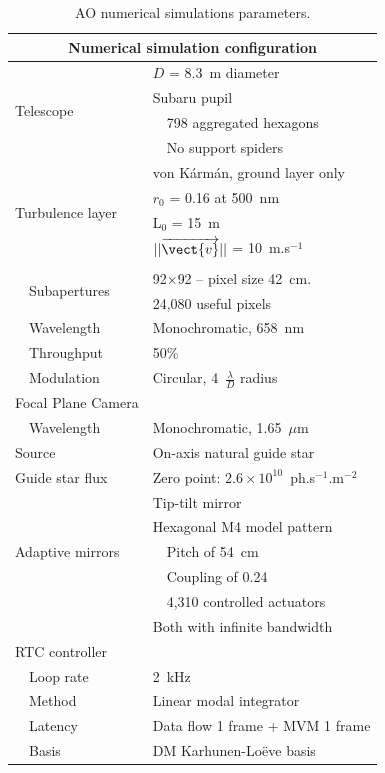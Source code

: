 \documentclass[twocolumn]{aastex62}
\begin{document}
\begin{table}[ht!]
		\centering
		\caption{%
			AO numerical simulations parameters.
		}
		\label{tab:simuParams}
		
		\renewcommand{\arraystretch}{1.2}
		\begin{tabular}{ll}
			\multicolumn{2}{c}{\textbf{Numerical simulation configuration}}\\
			\hline\hline
			\multirow{4}{*}{Telescope} & $D$ = 8.3~m diameter\\
			& Subaru pupil \\
			& $\quad$798 aggregated hexagons\\
			& $\quad$No support spiders\\
			\hline
			\multirow{5}{*}{Turbulence layer} & von Kármán, ground layer only\\
			& $r_0$ = 0.16 at 500~nm \\ %
			& L$_0$ = 15~m\\
			& $||\overrightarrow{\vect{v}}||$ = 10~m.s$^{-1}$\\
			\hline
			PWFS & \\
			\multirow{2}{*}{$\quad$Subapertures} & 92$\times$92 -- pixel size 42~cm.\\
			& 24,080 useful pixels\\
			$\quad$Wavelength & Monochromatic, 658~nm\\
			$\quad$Throughput & 50\% \\
			$\quad$Modulation & Circular, 4~$\frac{\lambda}{D}$ radius\\
			\hline
			Focal Plane Camera & \\
			$\quad$Wavelength & Monochromatic, 1.65~$\mu$m\\ 
			\hline 
			Source & On-axis natural guide star\\
			Guide star flux & Zero point: $2.6 \times 10^{10}$~ph.s$^{-1}$.m$^{-2}$\\
			\hline
			\multirow{5}{*}{Adaptive mirrors} & Tip-tilt mirror\\
			& Hexagonal M4 model pattern\\
			& $\quad$Pitch of 54~cm\\
			& $\quad$Coupling of 0.24\\
			& $\quad$4,310 controlled actuators\\
			& Both with infinite bandwidth\\
			\hline
			RTC controller & \\
			$\quad$Loop rate & 2~kHz\\
			$\quad$Method & Linear modal integrator\\
			$\quad$Latency & Data flow 1 frame + MVM 1 frame\\
			$\quad$Basis & DM Karhunen-Loëve basis\tablefootmark{(a)}\\
			\hline
		\end{tabular}
	\end{table}
\end{document}
